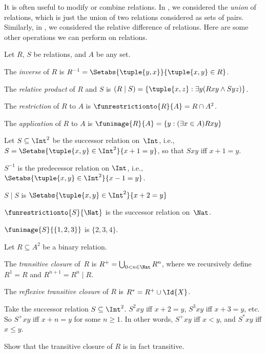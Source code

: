 \documentclass[../../../include/open-logic-section]{subfiles}
\begin{document}

It is often useful to modify or combine relations. In
, we considered the \emph{union}
of relations, which is just the union of two relations considered as
sets of pairs. Similarly, in ,
we considered the relative difference of relations. Here are some
other operations we can perform on relations.

\begin{defn} 
Let $R$, $S$ be relations, and $A$ be any set. 

The \emph{inverse} of $R$ is $R^{-1} = \Setabs{\tuple{y, x}}{\tuple{x,
    y} \in R}$.

The \emph{relative product} of $R$ and $S$ is $(R \mid S) =
\{\tuple{x, z} : \exists y(Rxy \land Syz)\}$.

The \emph{restriction} of $R$ to $A$ is $\funrestrictionto{R}{A}= R
\cap A^2$.

The \emph{application} of $R$ to $A$ is $\funimage{R}{A} = \{y :
(\exists x \in A)Rxy\}$
\end{defn}

\begin{ex}
Let $S \subseteq \Int^2$ be the successor relation on~$\Int$, i.e.,
$S = \Setabs{\tuple{x, y} \in \Int^2}{x + 1 = y}$, so that $Sxy$ iff $x + 1 = y$.

$S^{-1}$ is the predecessor relation on $\Int$, i.e.,
$\Setabs{\tuple{x,y}\in\Int^2}{x -1 =y}$.

$S\mid S$ is 
$ \Setabs{\tuple{x,y}\in\Int^2}{x + 2 =y}$

$\funrestrictionto{S}{\Nat}$ is the successor relation on~$\Nat$.

$\funimage{S}{\{1,2,3\}}$ is $\{2, 3, 4\}$.
\end{ex}

\begin{defn}Let $R \subseteq A^2$ be a binary relation. 
	
The \emph{transitive closure} of~$R$ is $R^+ = \bigcup_{0 < n \in
\Nat} R^n$, where we recursively define $R^1 = R$ and $R^{n+1} = R^n
\mid R$.

The \emph{reflexive transitive closure} of $R$ is $R^* = R^+ \cup
\Id{X}$.
\end{defn}

\begin{ex}
Take the successor relation $S \subseteq \Int^2$. $S^2xy$ iff $x + 2 =
y$, $S^3xy$ iff $x + 3 = y$, etc. So $S^+xy$ iff $x + n = y$ for some
$n \geq 1$. In other words, $S^+xy$ iff $x < y$, and $S^*xy$ iff $x \le
y$.
\end{ex}

\begin{prob}
Show that the transitive closure of $R$ is in fact transitive.
\end{prob}
\end{document}
